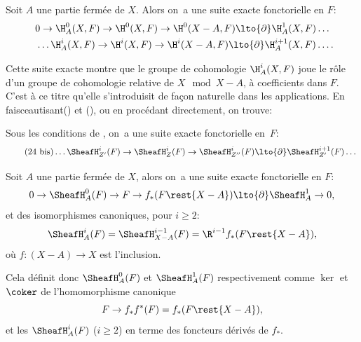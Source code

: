 \begin{corollaire} \label{I.2.9}
Soit $A$ une partie ferm\'ee de $X$. Alors on~a une suite exacte fonctorielle en $F$:
\begin{equation} \label{eq:I.27}
\begin{gathered}
0 \to \H^0_A(X, F) \to \H^0(X, F) \to \H^0(X-A, F) \lto{\partial} \H^1_A(X, F) \dots\\
\phantom{0}\dots \H^i_A(X, F) \to \H^i(X, F) \to \H^i(X-A, F) \lto{\partial} \H^{i+1}_A(X, F)\dots.
\end{gathered}
\end{equation}
\end{corollaire}

Cette suite exacte montre que le groupe de cohomologie $\H^i_A(X,
F)$ joue le r\^{o}le d'un groupe de cohomologie relative de $X\mod
X-A$, \`a coefficients dans $F$. C'est \`a ce titre qu'elle
s'introduisit de fa\c con naturelle dans les applications. En \og
faisceautisant\fg () et (), ou en
proc\'edant directement, on trouve:

\begin{corollaire} \label{I.2.10}
Sous les conditions de , on~a une suite exacte fonctorielle en~$F$:
\begin{equation*} \label{eq:I.24bis} \tag{24 bis}
\dots \SheafH^i_{Z'}(F) \to \SheafH^i_{Z}(F) \to \SheafH_{Z''}^i(F) \lto{\partial} \SheafH_{Z'}^{i+1}(F) \dots
\end{equation*}
\end{corollaire}

\begin{corollaire} \label{I.2.11}
Soit $A$ une partie ferm\'ee de $X$, alors on~a une suite exacte fonctorielle en $F$:
\begin{equation} \label{eq:I.28}
0 \to \SheafH_A^0(F) \to F \to f_*(F\rest{X-A}) \lto{\partial} \SheafH_A^1 \to 0,
\end{equation}
et des isomorphismes canoniques, pour $i\geq 2$:
\begin{equation} \label{eq:I.29}
\SheafH_A^i(F)= \SheafH_{X-A}^{i-1}(F)=\R^{i-1}f_*(F\rest{X-A}),
\end{equation}
o\`u $f: (X-A) \to X$ est l'inclusion.
\end{corollaire}

Cela d\'efinit donc $\SheafH^0_A(F)$ et $\SheafH_A^1(F)$ respectivement comme $\ker$ et $\coker$ de l'homomorphisme canonique
$$F \to f_*f^*(F)= f_*(F\rest{X-A}),
$$
et les $\SheafH_A^i(F)$ ($i\geq 2$) en terme des foncteurs d\'eriv\'es de $f_*$.

